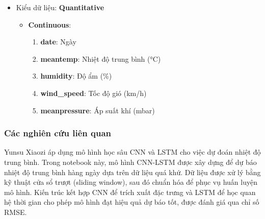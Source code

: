     \begin{itemize}
        \item Kiểu dữ liệu: \textbf{Quantitative} 
        \begin{itemize}
            \item \textbf{Continuous}:
             \begin{enumerate}[resume]
                \item \textbf{date}: Ngày

                \item \textbf{meantemp}: Nhiệt độ trung bình (°C)
 
                \item \textbf{humidity}: Độ ẩm (\%)

                \item \textbf{wind\_speed}: Tốc độ gió (km/h)

                \item \textbf{meanpressure}: Áp suất khí (mbar)
            \end{enumerate}

        \end{itemize}

    \end{itemize}

\subsubsection{Các nghiên cứu liên quan}
    Yunsu Xiaozi \cite{yunsuxiaozi} áp dụng mô hình học sâu CNN và LSTM cho việc dự đoán nhiệt độ trung bình. Trong notebook này, mô hình CNN-LSTM được xây dựng để dự báo nhiệt độ trung bình hàng ngày dựa trên dữ liệu quá khứ. Dữ liệu được xử lý bằng kỹ thuật cửa sổ trượt (sliding window), sau đó chuẩn hóa để phục vụ huấn luyện mô hình. Kiến trúc kết hợp CNN để trích xuất đặc trưng và LSTM để học quan hệ thời gian cho phép mô hình đạt hiệu quả dự báo tốt, được đánh giá qua chỉ số RMSE.


